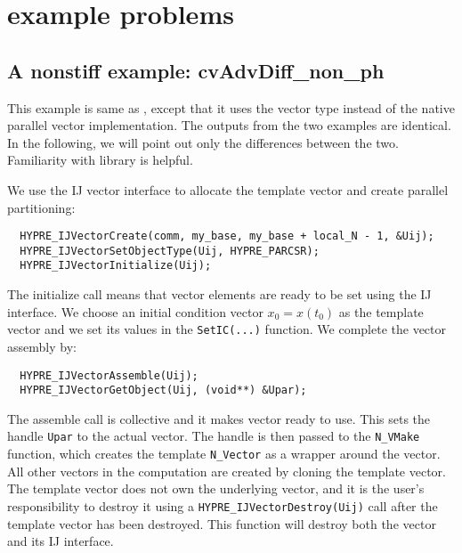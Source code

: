 \section{{\hypre} example problems}\label{s:ex_parhyp}

\subsection{A nonstiff example: cvAdvDiff\_non\_ph}\label{ss:cvAdvDiff_ph}

This example is same as , except that it
uses the {\hypre} vector type instead of the {\sundials} native
parallel vector implementation. 
The outputs from the two examples are identical. In the following, we will point 
out only the differences between the two. Familiarity with {\hypre} library 
\cite{hypre_um} is helpful.  

We use the {\hypre} IJ vector interface to allocate the template vector and 
create parallel partitioning: 
\begin{verbatim}
  HYPRE_IJVectorCreate(comm, my_base, my_base + local_N - 1, &Uij);
  HYPRE_IJVectorSetObjectType(Uij, HYPRE_PARCSR);
  HYPRE_IJVectorInitialize(Uij);
\end{verbatim}
The initialize call means that vector elements are ready to be set using 
the IJ interface. We choose an initial condition vector $x_0 = x(t_0)$ as the 
template vector and we set its values in the \verb|SetIC(...)| function. We 
complete the {\hypre} vector assembly by:
\begin{verbatim}
  HYPRE_IJVectorAssemble(Uij);
  HYPRE_IJVectorGetObject(Uij, (void**) &Upar);
\end{verbatim}
The assemble call is collective and it makes {\hypre} vector ready to use. 
This sets the handle \verb|Upar| to the actual {\hypre} vector. 
The handle is then passed to the \verb|N_VMake| function, which creates 
the template \verb|N_Vector| as a wrapper around the {\hypre} vector. 
All other vectors in the computation are created by cloning the template 
vector. The template vector does not own the underlying {\hypre} vector, 
and it is the user's responsibility to destroy it using a
\verb|HYPRE_IJVectorDestroy(Uij)| call after the template vector has been 
destroyed. This function will destroy both the {\hypre} vector and its IJ 
interface.

